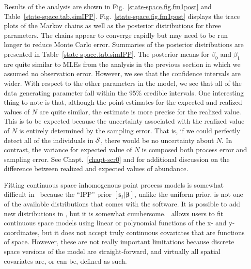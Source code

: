 Results of the analysis are shown in
Fig.~\ref{state-space.fig.fm1post} and
Table~\ref{state-space.tab.simIPP}.
Fig.~\ref{state-space.fig.fm1post}
displays the trace plots of the Markov chains as well as the posterior
distributions for three parameters. The chains appear to
converge rapidly but may need to be run longer to reduce Monte Carlo
error. Summaries of the posterior distributions are presented in
Table~\ref{state-space.tab.simIPP}. The posterior means for $\beta_0$
and $\beta_1$ are quite similar to MLEs from the analysis in the
previous section in which we assumed no observation error. However, we
see that the confidence intervals are wider. With respect to the other
parameters in the model, we see that all of the data
generating parameter fall within the 95\% credible intervals. One
interesting thing to note is that, although the point estimates for
the expected and realized values of $N$ are quite similar, the
estimate is more precise for the realized value. This is to be
expected because the uncertainty associated with the realized value of
$N$ is entirely determined by the sampling error. That is,
if we could perfectly detect all of the individuals in $\cal S$, there
would be no uncertainty about $N$. In contrast, the variance for
expected value of $N$ is composed both process error and sampling
error. See Chapt.~\ref{chapt-scr0} and
\citet{efford_fewster:2012} for additional discussion on the
difference between realized and expected values of abundance.


Fitting continuous space inhomogenous point process models is somewhat
difficult in \bugs~because the ``IPP'' prior $[\mathbf{s}_i | \bm
\beta]$, unlike the uniform prior, is not one of the
available distributions that comes with the software. It is
possible to add new distributions in \bugs, but it is somewhat
cumbersome.  \secr~allows
users to fit continuous space models using linear or polynomial functions of the x- and y-
coordinates, but it does not accept truly continuous covariates that
are functions of space. However, these
are not really important limitations because discrete
space versions of the model are straight-forward, and virtually all spatial
covariates are, or can be, defined as such.


